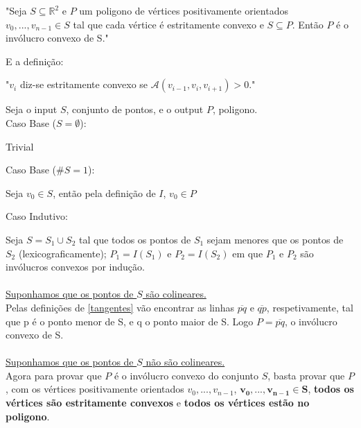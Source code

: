 \documentclass[11pt]{article}
\begin{document}
\begin{center}
    "Seja $S \subseteq \mathbb{R}^2$ e $P$ um poligono de vértices 
    positivamente orientados $v_0,...,v_{n-1} \in S$ tal que cada
    vértice é estritamente convexo e $S \subseteq P$. Então $P$ é
    o invólucro convexo de S."
\end{center}
E a definição:

\begin{center}
    "$v_i$ diz-se estritamente convexo se $\mathcal{A}(v_{i-1},v_i,v_{i+1}) > 0$."
\end{center}

Seja o input $S$, conjunto de pontos, e o output $P$, poligono.\\
Caso Base ($S = \emptyset$):\par
\hfill\begin{minipage}{\dimexpr\textwidth-1cm}
    Trivial\\
\end{minipage}
Caso Base ($\#S = 1$):\par
\hfill\begin{minipage}{\dimexpr\textwidth-1cm}
    Seja $v_0 \in S$, então pela definição de $I$, $v_0 \in P$\\
\end{minipage}
Caso Indutivo:\par
\hfill\begin{minipage}{\dimexpr\textwidth-1cm}
    Seja $S = S_1 \cup S_2$ tal que todos os pontos de $S_1$
    sejam menores que os pontos de $S_2$ (lexicograficamente); 
    $P_1 = I(S_1)$ e $P_2 = I(S_2)$ em que $P_1$ e $P_2$ são 
    invólucros convexos por indução.\\\\
    
    \underline{Suponhamos que os pontos de $S$ são colineares.}\\
    Pelas definições de \ref{tangentes} vão encontrar as linhas 
    $\overline{p q}$ e $\overline{q p}$, respetivamente,
    tal que p é o ponto menor de S, e q o ponto maior de S. 
    Logo $P = \overline{p q}$, o invólucro convexo de S.\\\\

    \underline{Suponhamos que os pontos de $S$ não são colineares.}\\
    Agora para provar que $P$ é o invólucro convexo
    do conjunto $S$, basta provar que $P$, com os vértices 
    positivamente orientados $v_0,...,v_{n-1}$, $\mathbf{v_0,...,v_{n-1} \in S}$, 
    \textbf{todos os vértices são estritamente convexos} e 
    \textbf{todos os vértices estão no poligono}.\\
    
    
    
\end{minipage}
\end{document}
